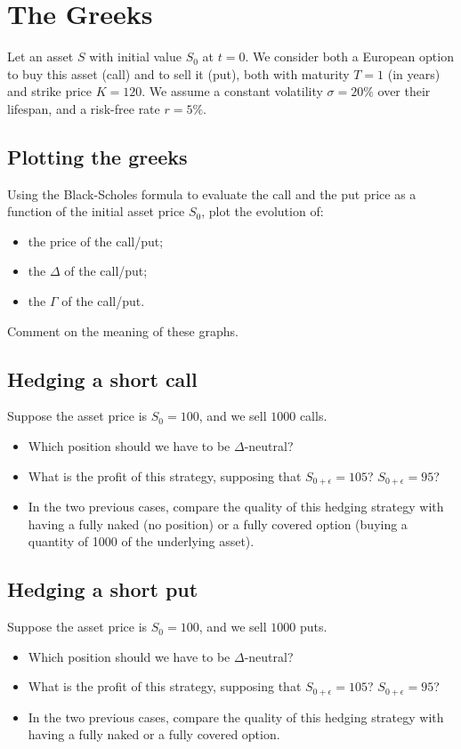 \section*{The Greeks}
Let an asset $S$ with initial value $S_0$ at $t=0$. We consider both a European option to buy this asset (call) and to sell it (put), both with maturity $T = 1$ (in years) and strike price $K = 120$. We assume a constant volatility $\sigma=20\%$ over their lifespan, and a risk-free rate $r=5\%$. 

\subsection*{Plotting the greeks}
Using the Black-Scholes formula to evaluate the call and the put price as a function of the initial asset price $S_0$, plot the evolution of:
\begin{itemize}
    \item the price of the call/put;
    \item the $\Delta$ of the call/put;
    \item the $\Gamma$ of the call/put.
\end{itemize}

\noindent Comment on the meaning of these graphs.

\subsection*{Hedging a short call}
Suppose the asset price is $S_0 = 100$, and we sell $1000$ calls. 
\begin{itemize}
    \item Which position should we have to be $\Delta$-neutral?
    \item What is the profit of this strategy, supposing that $S_{0+\epsilon} = 105$? $S_{0+\epsilon} = 95$? 
    \item In the two previous cases, compare the quality of this hedging strategy with having a fully naked (no position) or a fully covered option (buying a quantity of 1000 of the underlying asset).
\end{itemize}

\subsection*{Hedging a short put}
Suppose the asset price is $S_0 = 100$, and we sell $1000$ puts. 
\begin{itemize}
    \item Which position should we have to be $\Delta$-neutral?
    \item What is the profit of this strategy, supposing that $S_{0+\epsilon} = 105$? $S_{0+\epsilon} = 95$? 
    \item In the two previous cases, compare the quality of this hedging strategy with having a fully naked or a fully covered option.
\end{itemize}

